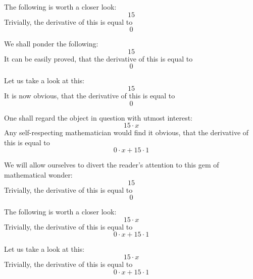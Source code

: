 \documentclass{article}
\begin{document}
The following is worth a closer look:
\begin{equation}
15 
\end{equation}
Trivially, the derivative of this is equal to
\begin{equation}
0 
\end{equation}

We shall ponder the following:
\begin{equation}
15 
\end{equation}
It can be easily proved, that the derivative of this is equal to
\begin{equation}
0 
\end{equation}

Let us take a look at this:
\begin{equation}
15 
\end{equation}
It is now obvious, that the derivative of this is equal to
\begin{equation}
0 
\end{equation}

One shall regard the object in question with utmost interest:
\begin{equation}
15 \cdot x 
\end{equation}
Any self-respecting mathematician would find it obvious, that the derivative of this is equal to
\begin{equation}
0 \cdot x + 15 \cdot 1 
\end{equation}

We will allow ourselves to divert the reader's attention to this gem of mathematical wonder:
\begin{equation}
15 
\end{equation}
Trivially, the derivative of this is equal to
\begin{equation}
0 
\end{equation}

The following is worth a closer look:
\begin{equation}
15 \cdot x 
\end{equation}
Trivially, the derivative of this is equal to
\begin{equation}
0 \cdot x + 15 \cdot 1 
\end{equation}

Let us take a look at this:
\begin{equation}
15 \cdot x 
\end{equation}
Trivially, the derivative of this is equal to
\begin{equation}
0 \cdot x + 15 \cdot 1 
\end{equation}
\end{document}

